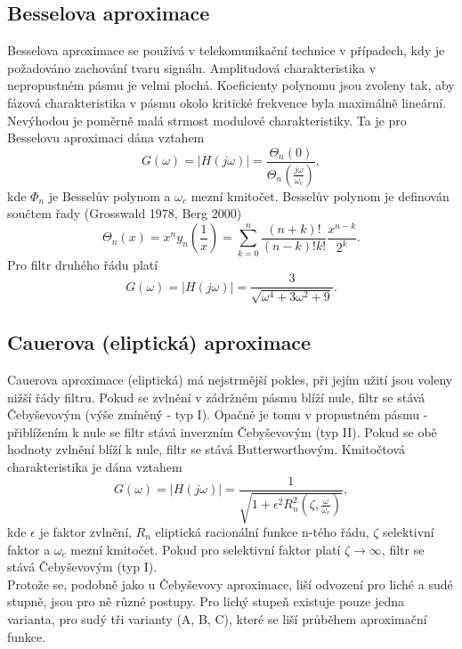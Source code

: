 \subsection{Besselova aproximace}
Besselova aproximace se používá v telekomunikační technice v případech, kdy je požadováno zachování tvaru signálu. Amplitudová charakteristika v nepropustném pásmu je velmi plochá. Koeficienty polynomu jsou zvoleny tak, aby fázová charakteristika v pásmu okolo kritické frekvence byla maximálně lineární. Nevýhodou je poměrně malá strmost modulové charakteristiky. Ta je pro Besselovu aproximaci dána vztahem
\begin{equation}
G(\omega) = |H(j\omega)| = \frac{\Theta _n(0)}{\Theta _n(\frac{j\omega}{\omega _c})},
\end{equation}
kde $\Phi _n$ je Besselův polynom a $\omega _c$ mezní kmitočet. Besselův polynom je definován součtem řady (Grosswald 1978, Berg 2000)
\begin{equation}
\Theta _n (x) = x^n y_n (\frac{1}{x}) = \sum_{k=0}^{n}\frac{(n+k)!}{(n-k)!k!}\frac{x^{n-k}}{2^k}.
\end{equation}
Pro filtr druhého řádu platí
\begin{equation}
G(\omega) = |H(j\omega)| = \frac{3}{\sqrt{\omega ^4 + 3\omega ^2 + 9}}.
\end{equation}
\subsection{Cauerova (eliptická) aproximace}
\noindent Cauerova aproximace (eliptická) má nejstrmější pokles, při jejím užití jsou voleny nižší řády filtru. Pokud se zvlnění v zádržném pásmu blíží nule, filtr se stává Čebyševovým (výše zmíněný - typ I). Opačně je tomu v propustném pásmu - přiblížením k nule se filtr stává inverzním Čebyševovým (typ II).  Pokud se obě hodnoty zvlnění blíží k nule, filtr se stává Butterworthovým. Kmitočtová charakteristika je dána vztahem
\begin{equation}
G(\omega) = |H(j\omega)| = \frac{1}{\sqrt{1 + \epsilon ^2 R_n ^2(\zeta, \frac{\omega}{\omega _c})}},
\end{equation}
kde $\epsilon$ je faktor zvlnění, $R_n$ eliptická racionální funkce n-tého řádu, $\zeta$ selektivní faktor a $\omega _c$ mezní kmitočet. Pokud pro selektivní faktor platí $\zeta \rightarrow \infty$, filtr se stává Čebyševovým (typ I).\\
Protože se, podobně jako u Čebyševovy aproximace, liší odvození pro liché a sudé stupně, jsou pro ně různé postupy. Pro lichý stupeň existuje pouze jedna varianta, pro sudý tři varianty (A, B, C), které se liší průběhem aproximační funkce.
